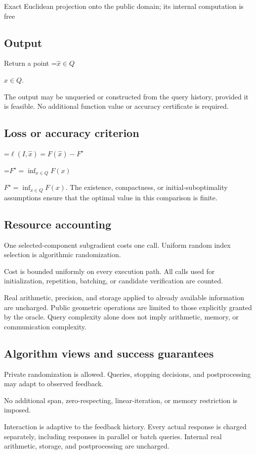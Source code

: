 \documentclass[10pt,a4paper]{article}
\newcommand{\AtlasMath}[1]{\par\begingroup\centering\setbox0=\hbox{$\displaystyle #1$}\ifdim\wd0>1.4\linewidth\typeout{ATLAS WIDE FORMULA: \the\wd0}\fi\ifdim\wd0>\linewidth\resizebox{\linewidth}{!}{\box0}\else\box0\fi\par\endgroup}
\newcommand{\AtlasInlineMath}[1]{\begingroup\setbox0=\hbox{$#1$}\ifdim\wd0>.4\linewidth\endgroup\AtlasMath{#1}\else\endgroup$#1$\fi}
\begin{document}
Exact Euclidean projection onto the public domain; its internal computation is free

\subsection{Output}
Return a point \AtlasInlineMath{\widehat x\in Q}.

The output may be unqueried or constructed from the query history, provided it is feasible. No additional function value or accuracy certificate is required.

\subsection{Loss or accuracy criterion}

\AtlasMath{\ell(I,\widehat{x})=F(\widehat{x})-F^\star}


\AtlasInlineMath{F^\star=\inf_{x\in Q}F(x)}. The existence, compactness, or initial-suboptimality assumptions ensure that the optimal value in this comparison is finite.

\subsection{Resource accounting}
One selected-component subgradient costs one call. Uniform random index selection is algorithmic randomization.

Cost is bounded uniformly on every execution path. All calls used for initialization, repetition, batching, or candidate verification are counted.

Real arithmetic, precision, and storage applied to already available information are uncharged. Public geometric operations are limited to those explicitly granted by the oracle. Query complexity alone does not imply arithmetic, memory, or communication complexity.

\subsection{Algorithm views and success guarantees}
Private randomization is allowed. Queries, stopping decisions, and postprocessing may adapt to observed feedback.

No additional span, zero-respecting, linear-iteration, or memory restriction is imposed.

Interaction is adaptive to the feedback history. Every actual response is charged separately, including responses in parallel or batch queries. Internal real arithmetic, storage, and postprocessing are uncharged.
\end{document}
